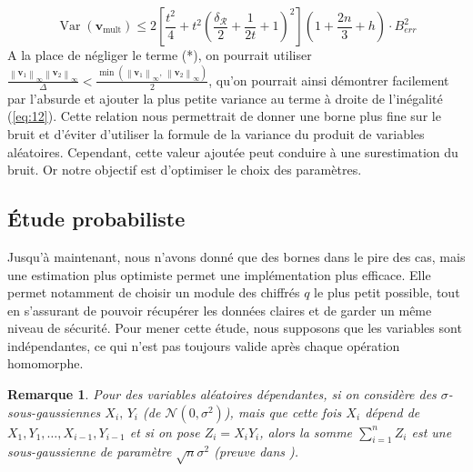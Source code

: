 \documentclass[11pt, headsepline, a4paper, fleqn, oneside]{article}
\newtheorem{rem}{Remarque}
\begin{document}
\begin{equation}\label{eq:12}
    \operatorname{Var}(\boldsymbol{v}_\mathrm{mult}) \leq 2\left[\frac{t^2}{4}+t^2 \left(\frac{\delta_{\mathcal{R}}}{2} + \frac{1}{2t} + 1\right)^2\right](1+\frac{2n}{3}+h) \cdot B_{err} ^2
\end{equation}
A la place de négliger le terme (*), on pourrait utiliser $\frac{\left\|\boldsymbol{v}_{1}\right\|_{\infty}\left\|\boldsymbol{v}_{2}\right\|_{\infty}}{\Delta} < \frac{\min(\left\|\boldsymbol{v}_{1}\right\|_\infty,\, \left\|\boldsymbol{v}_{2}\right\|_\infty)}{2}$, qu'on pourrait ainsi démontrer facilement par l'absurde et ajouter la plus petite variance au terme à droite de l'inégalité (\ref{eq:12}). Cette relation nous permettrait de donner une borne plus fine sur le bruit et d'éviter d'utiliser la formule de la variance du produit de variables aléatoires. Cependant, cette valeur ajoutée peut conduire à une surestimation du bruit. Or notre objectif est d'optimiser le choix des paramètres.

\subsection{Étude probabiliste}\label{3.2}
Jusqu'à maintenant, nous n'avons donné que des bornes dans le pire des cas, mais une estimation plus optimiste permet une implémentation plus efficace. Elle permet notamment de choisir un module des chiffrés $q$ le plus petit possible, tout en s'assurant de pouvoir récupérer les données claires et de garder un même niveau de sécurité. Pour mener cette étude, nous supposons que les variables sont indépendantes, ce qui n'est pas toujours valide après chaque opération homomorphe.
\begin{rem}
Pour des variables aléatoires dépendantes, si on considère des $\sigma$-sous-gaussiennes $X_i, \, Y_i$ (de $\mathcal{N}(0, \sigma ^2)$), mais que cette fois $X_i$ dépend de $X_{1}, Y_{1}, \ldots, X_{i-1}, Y_{i-1}$ et si on pose $Z_i = X_i Y_i$, alors la somme $\sum_{i=1}^{n} Z_i$ est une sous-gaussienne de paramètre $\sqrt{n} \sigma^{2}$ (preuve dans \cite{cryptoeprint:2019:520}).
\end{rem}
\end{document}
